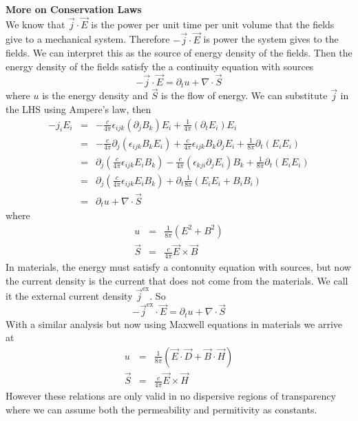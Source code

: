 \documentclass[12pt,a4paper]{article}
\begin{document}
\textbf{More on Conservation Laws}\\
We know that $\vec{j}\cdot \vec{E}$ is the power per unit time per unit volume that the fields give to a mechanical system. Therefore $-\vec{j}\cdot \vec{E}$ is power the system gives to the fields. We can interpret this as the source of energy density of the fields. Then the energy density of the fields satisfy the a continuity equation with sources
\begin{equation}
	-\vec{j}\cdot \vec{E} = \partial_t u + \nabla \cdot \vec{S}
\end{equation}
where $u$ is the energy density and $\vec{S}$ is the flow of energy. We can substitute $\vec{j}$ in the LHS using Ampere's law, then
\begin{eqnarray}
	-j_iE_i & = & -\frac{c}{4\pi}\epsilon_{ijk}(\partial_j B_k)E_i + \frac{1}{4\pi}(\partial_t E_i)E_i \\
	& = & - \frac{c}{4\pi}\partial_j (\epsilon_{ijk}B_k E_i) + \frac{c}{4\pi}\epsilon_{ijk}B_k\partial_j E_i + \frac{1}{8\pi}\partial_{t}(E_iE_i) \\
	& = & \partial_j \left( \frac{c}{4\pi} \epsilon_{ijk}E_i B_k\right) -\frac{c}{4\pi}(\epsilon_{kji}\partial_j E_i)B_k + \frac{1}{8\pi}\partial_t (E_iE_i)\\
	& = & \partial_j \left( \frac{c}{4\pi} \epsilon_{ijk}E_i B_k\right) + \partial_t \frac{1}{8\pi} (E_iE_i + B_iB_i) \\
	& = & \partial_t u + \nabla \cdot \vec{S}
\end{eqnarray}
where
\begin{eqnarray}
	u & = & \frac{1}{8\pi} (E^2 + B^2) \\
	\vec{S} & = & \frac{c}{4\pi}\vec{E} \times \vec{B}
\end{eqnarray}
In materials, the energy must satisfy a contonuity equation with sources, but now the current density  is the current that does not come from the materials. We call it the external current density $\vec{j}^{\text{ex}}$. So 
\begin{equation}
	-\vec{j}^{\text{ex}}\cdot \vec{E} = \partial_t u + \nabla \cdot \vec{S}
\end{equation}
With a similar analysis but now using Maxwell equations in materials we arrive at
\begin{eqnarray}
	u & = & \frac{1}{8\pi} (\vec{
	E}\cdot\vec{D} + \vec{B}\cdot \vec{H}) \\
	\vec{S} & = & \frac{c}{4\pi}\vec{E} \times \vec{H}
\end{eqnarray}
However these relations are only valid in no dispersive regions of transparency where we can assume both the permeability and permitivity as constants. 
\end{document}

